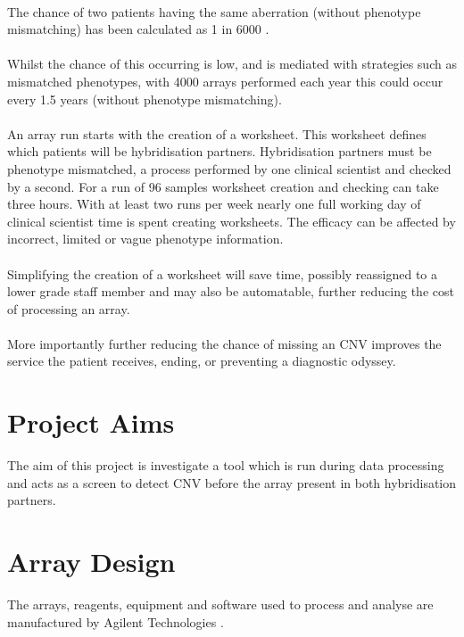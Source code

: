 \paragraph*{}
The chance of two patients having the same aberration (without phenotype mismatching) has been calculated as 1 in 6000 \cite{joowook_ahn_frequency_2015}.
\paragraph*{}
Whilst the chance of this occurring is low, and is mediated with strategies such as mismatched phenotypes, with 4000 arrays performed each year this could occur every 1.5 years (without phenotype mismatching). 
\paragraph*{}
An array run starts with the creation of a worksheet. This worksheet defines which patients will be hybridisation partners.  Hybridisation partners must be phenotype mismatched, a process performed by one clinical scientist and checked by a second. For a run of 96 samples worksheet creation and checking can take three hours. With at least two runs per week nearly one full working day of clinical scientist time is spent creating worksheets.
The efficacy can be affected by incorrect, limited or vague phenotype information.
\paragraph*{}
Simplifying the creation of a worksheet will save time, possibly reassigned to a lower grade staff member and may also be automatable, further reducing the cost of processing an array.
\paragraph*{}
More importantly further reducing the chance of missing an CNV improves the service the patient receives, ending, or preventing a diagnostic odyssey.

\section{Project Aims}
The aim of this project is investigate a tool which is run during data processing and acts as a screen to detect CNV before the array present in both hybridisation partners.

\section{Array Design}
The arrays, reagents, equipment and software used to process and analyse are manufactured by Agilent Technologies \cite{agilenttechnologies_microarrays}.
